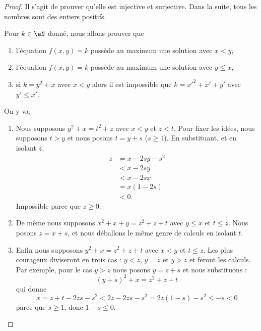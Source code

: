 \begin{proof}
	Il s'agit de prouver qu'elle est injective et surjective. Dans la suite, tous les nombres sont des entiers positifs.
	\begin{subproof}

		Pour \( k\in \eN\) donné, nous allons prouver que
		\begin{enumerate}
			\item
			      l'équation \( f(x,y)=k\) possède au maximum une solution avec \( x<y\),
			\item
			      l'équation \( f(x,y)=k\) possède au maximum une solution avec \( y\leq x\),
			\item
			      si \(   k=y^2+x \) avec \( x<y\) alors il est impossible que \( k=x'^2+x'+y'\) avec \( y'\leq x'\).
		\end{enumerate}
		On y va.
		\begin{enumerate}
			\item
			      Nous supposons \( y^2+x=t^2+z\) avec \( x<y\) et \( z<t\). Pour fixer les idées, nous supposons \( t>y\) et nous posons \( t=y+s\) (\( s\geq 1\)). En substituant, et en isolant \( z\),
			      \begin{subequations}
				      \begin{align}
					      z & =x-2sy-s^2 \\
					        & <x-2sy     \\
					        & <x-2sx     \\
					        & =x(1-2s)   \\
					        & <0.
				      \end{align}
			      \end{subequations}
			      Impossible parce que \( z\geq 0\).
			\item
			      De même nous supposons \( x^2+x+y=z^2+z+t\) avec \( y\leq x\) et \( t\leq z\). Nous posons \( z=x+s\), et nous déballons le même genre de calculs en isolant \( t\).
			\item
			      Enfin nous supposons \( y^2+x=z^2+z+t\) avec \( x<y\) et \( t\leq z\). Les plus courageux diviseront en trois cas : \( y<z\), \( y=z\) et \( y>z\) et feront les calculs. Par exemple, pour le cas \( y>z\) nous posons \( y=z+s\) et nous substituons :
			      \begin{equation}
				      (y+s)^2+x=z^2+z+t
			      \end{equation}
			      qui donne
			      \begin{equation}
				      x=z+t-2zs-s^2<2z-2zs-s^2=2z(1-s)-s^2\leq -s<0
			      \end{equation}
			      parce que \( s\geq 1\), donc \( 1-s\leq 0\).
		\end{enumerate}


\end{subproof}
\end{proof}
